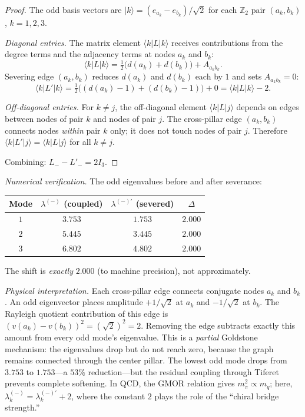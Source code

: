 \documentclass[11pt,a4paper]{amsart}
\theoremstyle{remark}
\newcommand{\bbZ}{\mathbb{Z}}
\begin{document}
\begin{proof}
The odd basis vectors are $|k\rangle = (e_{a_k} - e_{b_k}) / \sqrt{2}$ for
each $\bbZ_2$ pair $(a_k, b_k)$, $k = 1, 2, 3$.

\emph{Diagonal entries.} The matrix element $\langle k | L | k \rangle$
receives contributions from the degree terms and the adjacency terms at
nodes $a_k$ and $b_k$:
\begin{equation}
\langle k | L | k \rangle = \tfrac{1}{2}\bigl(d(a_k) + d(b_k)\bigr) + A_{a_k b_k}.
\end{equation}
Severing edge $(a_k, b_k)$ reduces $d(a_k)$ and $d(b_k)$ each by $1$ and
sets $A_{a_k b_k} = 0$:
\begin{equation}
\langle k | L' | k \rangle = \tfrac{1}{2}\bigl((d(a_k) - 1) + (d(b_k) - 1)\bigr) + 0 = \langle k | L | k \rangle - 2.
\end{equation}

\emph{Off-diagonal entries.} For $k \neq j$, the off-diagonal element
$\langle k | L | j \rangle$ depends on edges between nodes of pair $k$ and
nodes of pair $j$. The cross-pillar edge $(a_k, b_k)$ connects nodes
\emph{within} pair $k$ only; it does not touch nodes of pair $j$. Therefore
$\langle k | L' | j \rangle = \langle k | L | j \rangle$ for all
$k \neq j$.

Combining: $L_- - L'_- = 2 I_3$.
\end{proof}

\emph{Numerical verification.} The odd eigenvalues before and after severance:
\begin{center}
\begin{tabular}{cccc}
\toprule
Mode & $\lambda^{(-)}$ (coupled) & $\lambda^{(-)\prime}$ (severed) & $\Delta$ \\
\midrule
$1$ & $3.753$ & $1.753$ & $2.000$ \\
$2$ & $5.445$ & $3.445$ & $2.000$ \\
$3$ & $6.802$ & $4.802$ & $2.000$ \\
\bottomrule
\end{tabular}
\end{center}
The shift is \emph{exactly} $2.000$ (to machine precision), not
approximately.

\emph{Physical interpretation.} Each cross-pillar edge connects conjugate
nodes $a_k$ and $b_k$. An odd eigenvector places amplitude $+1/\sqrt{2}$
at $a_k$ and $-1/\sqrt{2}$ at $b_k$. The Rayleigh quotient contribution of
this edge is $(v(a_k) - v(b_k))^2 = (\sqrt{2})^2 = 2$. Removing the edge
subtracts exactly this amount from every odd mode's eigenvalue. This is a
\emph{partial} Goldstone mechanism: the eigenvalues drop but do not reach
zero, because the graph remains connected through the center pillar. The
lowest odd mode drops from $3.753$ to $1.753$---a $53\%$ reduction---but the
residual coupling through Tiferet prevents complete softening. In QCD, the
GMOR relation gives $m_\pi^2 \propto m_q$; here,
$\lambda^{(-)}_k = \lambda^{(-)\prime}_k + 2$, where the constant $2$ plays
the role of the ``chiral bridge strength.''
\end{document}
